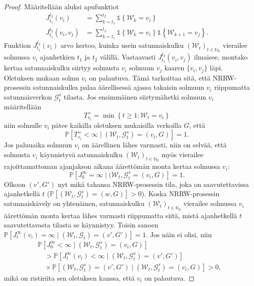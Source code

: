 \documentclass[finnish, 12pt, a4paper, sci, utf8, pdfa]{aaltothesis}
\newcommand{\N}{\mathbb{N}}
\newcommand{\Grandom}{\mathcal{G}}
\newcommand{\Wrandom}{\mathcal{W}}
\newcommand{\indicator}{\mathopen{\mathds{1}}}
\newcommand*{\prob}{\mathbb{P}}
\begin{document}
\begin{proof}
   Määritellään aluksi apufunktiot
   \begin{align*}
      J_{t_{1}}^{t_{2}}(v_{i})         &= \sum_{k = t_{1}}^{t_{2}} \indicator \left\{ \Wrandom_{k} = v_{i} \right\} \\
      J_{t_{1}}^{t_{2}}(v_{i}, v_{j})  &= \sum_{k = t_{1}}^{t_{2}} \indicator \left\{ \Wrandom_{k} = v_{i} \right\} \indicator \left\{ \Wrandom_{k+1} = v_{j} \right\}.
   \end{align*}
   Funktion $ J_{t_{1}}^{t_{2}}(v_{i}) $ arvo kertoo, kuinka usein satunnaiskulku $ (\Wrandom_{t})_{t \in \N_{0}} $ vierailee solmussa $ v_{i} $ ajanhetkien $ t_{1} $ ja $ t_{2} $ välillä.
   Vastaavasti $ J_{t_{1}}^{t_{2}}(v_{i}, v_{j}) $ ilmaisee, montako kertaa satunnaiskulku siirtyy solmusta $ v_{i} $ solmuun $ v_{j} $ kaaren $ \{ v_{i}, v_{j} \} $ läpi.
   Oletuksen mukaan solmu $ v_{i} $ on palautuva. Tämä tarkoittaa sitä, että NRRW-prosessin satunnaiskulku palaa äärellisessä ajassa takaisin solmuun $ v_{i} $ riippumatta satunnaisverkon
   $ \Grandom_{t}^{s} $ tilasta. Jos ensimmäinen siirtymähetki solmuun $ v_{i} $ määritellään
   \[
      T_{v_{i}}^{+} = \min \left\{ t \geq 1 : \Wrandom_{t} = v_{i} \right\}
   \]
   niin solmulle $ v_{i} $ pätee kaikilla oletuksen mukaisilla verkoilla $ G $, että
   \[
      \prob \left[ T_{v_{i}}^{+} < \infty \mid (\Wrandom_{t}, \Grandom_{t}^{s}) = (v_{i}, G) \right] = 1.
   \]
   Jos paluuaika solmuun $ v_{i} $ on äärellinen lähes varmasti, niin on selvää, että solmusta $ v_{i} $ käynnistyvä satunnaiskulku $ (\Wrandom_{t})_{t \in \N_{0}} $ myös vierailee
   rajoittamattoman ajanjakson aikana äärettömän monta kertaa solmussa $ v_{i} $:
   \begin{equation}
      \prob \left[ J_{0}^{\infty} = \infty \mid (\Wrandom_{t}, \Grandom_{t}^{s} = (v_{i}, G) \right] = 1.
      \label{equation:oletus}
   \end{equation}
   Olkoon $ (v', G') $ nyt mikä tahansa NRRW-prosessin tila, joka on saavutettavissa ajanhetkellä $ t $ ($ \prob \left[ (\Wrandom_{t}, \Grandom_{t}^{s}) = (w, G) \right] > 0 $).
   Koska NRRW-prosessin satunnaiskävely on yhtenäinen, satunnaiskulku $ (\Wrandom_{t})_{t \in \N_{0}} $ vierailee solmussa $ v_{i} $ äärettömän monta kertaa lähes varmasti riippumatta 
   siitä, mistä ajanhetkellä $ t $ saavutettavasta tilasta se käynnistyy. Toisin sanoen $ \prob \left[ J_{t}^{\infty}(v_{i}) = \infty \mid (\Wrandom_{t}, \Grandom_{t}) = (v', G') \right] = 1 $.
   Jos näin ei olisi, niin
   \[
      \begin{split}
      & \prob \left[ J_{0}^{\infty} < \infty \mid (\Wrandom_{t}, \Grandom_{t}^{s}) = (v_{i}, G) \right] \\
      & \quad > \prob \left[ J_{t}^{\infty}(v_{i}) < \infty \mid (\Wrandom_{t}, \Grandom_{t}^{s}) = (v', G') \right] \\
      & \quad \times \prob \left[ (\Wrandom_{t}, \Grandom_{t}^{s}) = (v', G') \mid (\Wrandom_{t}, \Grandom_{t}^{s}) = (v_{i}, G) \right] > 0,
      \end{split}
   \]
   mikä on ristiriita sen oletuksen kanssa, että $ v_{i} $ on palautuva.


\end{proof}
\end{document}
